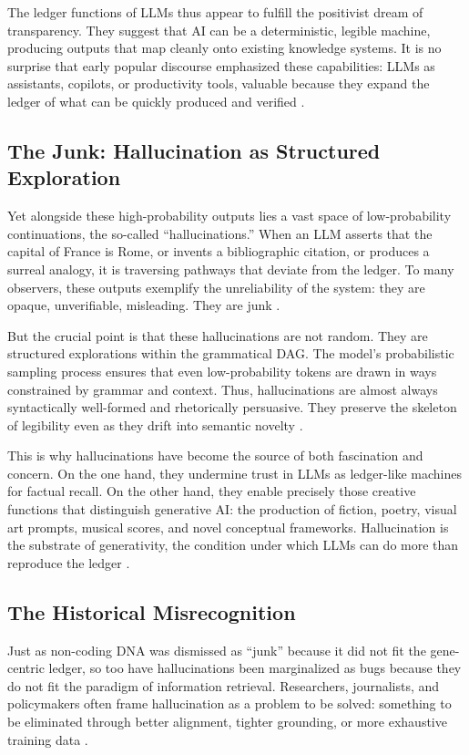 \documentclass[12pt]{article}
\begin{document}
{{{The ledger functions of LLMs thus appear to fulfill the positivist dream of transparency. They suggest that AI can be a deterministic, legible machine, producing outputs that map cleanly onto existing knowledge systems. It is no surprise that early popular discourse emphasized these capabilities: LLMs as assistants, copilots, or productivity tools, valuable because they expand the ledger of what can be quickly produced and verified \citep{bommasani2021}.

\subsection{The Junk: Hallucination as Structured Exploration}
Yet alongside these high-probability outputs lies a vast space of low-probability continuations, the so-called ``hallucinations.'' When an LLM asserts that the capital of France is Rome, or invents a bibliographic citation, or produces a surreal analogy, it is traversing pathways that deviate from the ledger. To many observers, these outputs exemplify the unreliability of the system: they are opaque, unverifiable, misleading. They are junk \citep{bender2021}.

But the crucial point is that these hallucinations are not random. They are structured explorations within the grammatical DAG. The model’s probabilistic sampling process ensures that even low-probability tokens are drawn in ways constrained by grammar and context. Thus, hallucinations are almost always syntactically well-formed and rhetorically persuasive. They preserve the skeleton of legibility even as they drift into semantic novelty \citep{shanahan2023}.

This is why hallucinations have become the source of both fascination and concern. On the one hand, they undermine trust in LLMs as ledger-like machines for factual recall. On the other hand, they enable precisely those creative functions that distinguish generative AI: the production of fiction, poetry, visual art prompts, musical scores, and novel conceptual frameworks. Hallucination is the substrate of generativity, the condition under which LLMs can do more than reproduce the ledger \citep{hofstadter1995}.

\subsection{The Historical Misrecognition}
Just as non-coding DNA was dismissed as ``junk'' because it did not fit the gene-centric ledger, so too have hallucinations been marginalized as bugs because they do not fit the paradigm of information retrieval. Researchers, journalists, and policymakers often frame hallucination as a problem to be solved: something to be eliminated through better alignment, tighter grounding, or more exhaustive training data \citep{bender2021, marcus2022}.

}}}
\end{document}
